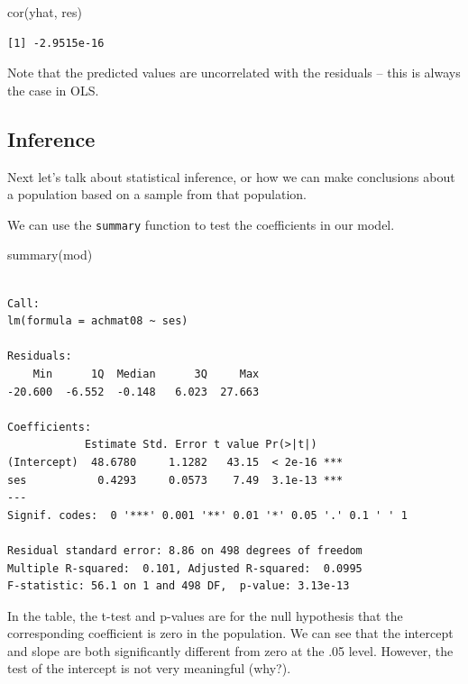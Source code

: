 \documentclass[
  letterpaper,
  DIV=11,
  numbers=noendperiod]{scrreprt}
\newenvironment{Shaded}{\begin{snugshade}}{\end{snugshade}}
\newcommand{\FunctionTok}[1]{\textcolor[rgb]{0.28,0.35,0.67}{#1}}
\newcommand{\NormalTok}[1]{\textcolor[rgb]{0.00,0.23,0.31}{#1}}
\begin{document}
\begin{Shaded}
\begin{Highlighting}[]
\FunctionTok{cor}\NormalTok{(yhat, res)}
\end{Highlighting}
\end{Shaded}

\begin{verbatim}
[1] -2.9515e-16
\end{verbatim}

Note that the predicted values are uncorrelated with the residuals --
this is always the case in OLS.

\hypertarget{inference}{%
\subsection{Inference}\label{inference}}

Next let's talk about statistical inference, or how we can make
conclusions about a population based on a sample from that population.

We can use the \texttt{summary} function to test the coefficients in our
model.

\begin{Shaded}
\begin{Highlighting}[]
\FunctionTok{summary}\NormalTok{(mod)}
\end{Highlighting}
\end{Shaded}

\begin{verbatim}

Call:
lm(formula = achmat08 ~ ses)

Residuals:
    Min      1Q  Median      3Q     Max 
-20.600  -6.552  -0.148   6.023  27.663 

Coefficients:
            Estimate Std. Error t value Pr(>|t|)    
(Intercept)  48.6780     1.1282   43.15  < 2e-16 ***
ses           0.4293     0.0573    7.49  3.1e-13 ***
---
Signif. codes:  0 '***' 0.001 '**' 0.01 '*' 0.05 '.' 0.1 ' ' 1

Residual standard error: 8.86 on 498 degrees of freedom
Multiple R-squared:  0.101, Adjusted R-squared:  0.0995 
F-statistic: 56.1 on 1 and 498 DF,  p-value: 3.13e-13
\end{verbatim}

In the table, the t-test and p-values are for the null hypothesis that
the corresponding coefficient is zero in the population. We can see that
the intercept and slope are both significantly different from zero at
the .05 level. However, the test of the intercept is not very meaningful
(why?).
\end{document}
